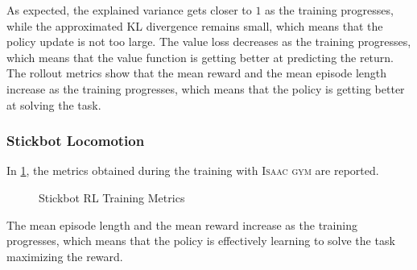 As expected, the explained variance gets closer to $1$ as the training progresses, while the approximated KL divergence remains small, which means that the policy update is not too large. The value loss decreases as the training progresses, which means that the value function is getting better at predicting the return. The rollout metrics show that the mean reward and the mean episode length increase as the training progresses, which means that the policy is getting better at solving the task.

\subsubsection{Stickbot Locomotion}

In \cref{fig:stickbotresults}, the metrics obtained during the training with \textsc{Isaac gym} are reported.

\begin{figure}
    \centering
    \caption{Stickbot RL Training Metrics}
    \label{fig:stickbotresults}
\end{figure}

The mean episode length and the mean reward increase as the training progresses, which means that the policy is effectively learning to solve the task maximizing the reward.
